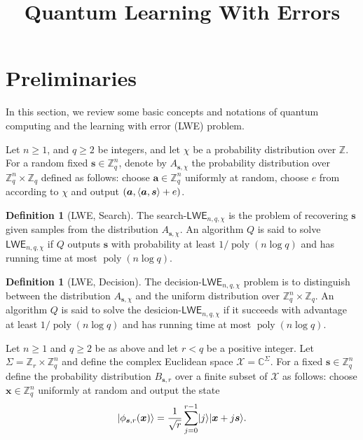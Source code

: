 \documentclass[11pt]{article}
\title{Quantum Learning With Errors}
\author{
}
\date{}
\theoremstyle{plain}
\theoremstyle{definition}
\newtheorem{definition}[theorem]{Definition}
\DeclareMathOperator{\poly}{poly}
\DeclarePairedDelimiter{\ket}{\lvert}{\rangle}
\DeclarePairedDelimiter{\lrang}{\langle}{\rangle}
\def\C{\ensuremath{\mathbb{C}}}
\def\Z{\ensuremath{\mathbb{Z}}}
\def\lwe{\ensuremath{\mathsf{LWE}}}
\begin{document}
\maketitle








\section{Preliminaries}
\label{sec:preli}

In this section, we review some basic concepts and notations of quantum computing and the learning with error (LWE) problem. 

Let $n \ge 1$, and $q \ge 2$ be integers, and let $\chi$ be a probability distribution over $\Z$. For a random fixed $\bm{s} \in \Z_q^n$, denote by $A_{\bm{s}, \chi}$ the probability distribution over $\Z_q^n \times \Z_q$ defined as follows: choose $\bm{a} \in \Z_q^n$ uniformly at random, choose $e$ from according to $\chi$ and output  $(\bm{a}, \lrang{\bm{a}, \bm{s}} + e)$.
\begin{definition}[LWE, Search]
The search-$\lwe_{n, q, \chi}$ is the problem of recovering $\bm{s}$ given samples from the distribution $A_{\bm{s}, \chi}$. An algorithm $Q$ is said to solve $\lwe_{n, q, \chi}$ if $Q$  outputs $\bm{s}$ with probability at least $1 / \poly(n\log q)$ and has running time at most $\poly(n \log q)$.
\end{definition}
\begin{definition}[LWE, Decision]
    The decision-$\lwe_{n, q, \chi}$ problem is to distinguish between the distribution $A_{\bm{s}, \chi}$ and the uniform distribution over $\Z_q^n \times \Z_q$. An algorithm $Q$ is said to solve the desicion-$\lwe_{n, q, \chi}$ if it succeeds with advantage at least $1 / \poly(n\log q)$ and has running time at most $\poly(n\log q)$. 
\end{definition}
Let $n \ge 1$ and $q \ge 2$ be as above and let $r < q$ be a positive integer. Let $\Sigma = \Z_r \times \Z_q^n$ and define the complex Euclidean space $\mathcal{X} = \C^\Sigma$. For a fixed $\bm{s} \in \Z_q^n$ define the probability distribution $B_{\bm{s}, r}$ over a finite subset of $\mathcal{X}$ as follows: choose $\bm{x} \in \Z_q^n$ uniformly at random and output the state
\[ \ket{\phi_{\bm{s}, r}(\bm{x})} = \frac{1}{\sqrt{r}} \sum_{j = 0}^{r - 1}\ket{j}\ket{\bm{x} + j\bm{s}}. \]
\end{document}

